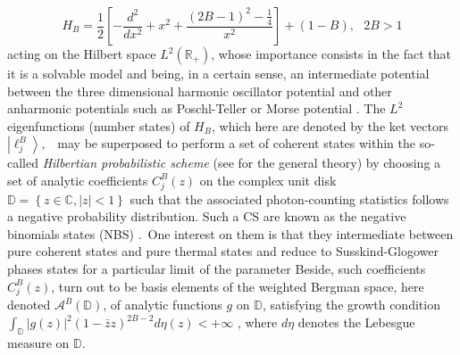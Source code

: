\documentclass[12pt,reqno]{amsart}
\theoremstyle{definition}
\theoremstyle{remark}
\numberwithin{equation}{section}
\begin{document}
 \begin{equation}
      \label{r3}
H_{B}=\frac{1}{2}\left[ -\frac{d^{2}}{dx^{2}}+x^{2}+\frac{(2B-1)^{2}-\frac{1%
}{4}}{x^{2}}\right] +\left( 1-B\right) ,\text{ \ \ \ \ \ }2B>1  
\end{equation}
acting on the Hilbert space $L^{2}\left( \mathbb{R}_{+}\right) $, whose
importance consists in the fact that it is a solvable model and being, in a
certain sense, an intermediate potential between the three dimensional
harmonic oscillator potential and other anharmonic potentials such as
Poschl-Teller or Morse potential \cite{PD1, PD2}. The $L^{2}$
eigenfunctions (number states) of $H_{B}$, which here are denoted by the ket
vectors $\left\vert \ell _{j}^{B}\right\rangle ,$ \ may be superposed to
perform a set of coherent states within the so-called \textit{Hilbertian
probabilistic scheme} (see \cite{G}for the general theory) by
choosing a set of analytic coefficients $C_{j}^{B}\left( z\right) $ on the
complex unit disk $\mathbb{D=}\left\{ z\in \mathbb{C},\left\vert
z\right\vert <1\right\} $ such that the associated photon-counting
statistics follows a negative probability distribution. Such a CS are known
as the negative binomials states (NBS) \cite{Mou1}.\ One interest on
them is that they intermediate between pure coherent states and pure thermal
states \cite{GJT}and reduce to Susskind-Glogower phases states for
a particular limit of the parameter \cite{FS} Beside, such
coefficients $C_{j}^{B}\left( z\right) $, turn out to be basis elements of
the weighted Bergman space, here denoted $\mathcal{A}^{B}\left( \mathbb{D}%
\right) $, of analytic functions $g$ on $\mathbb{D}$, satisfying the growth
condition $\int_{\mathbb{D}}|g(z)|^{2}(1-\bar{z}z)^{2B-2}d\eta (z)<+\infty $%
, where $d\eta $ denotes the Lebesgue measure on $\mathbb{D}$.
\end{document}
